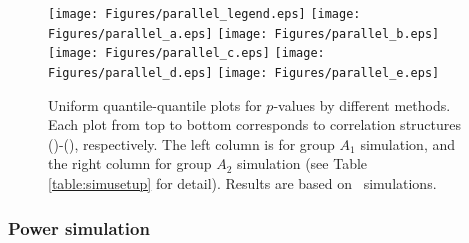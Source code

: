 	
	
	\begin{figure}[!ht]
		\begin{center}
			\texttt{[image: Figures/parallel\_legend.eps]}
			\texttt{[image: Figures/parallel\_a.eps]}
			\texttt{[image: Figures/parallel\_b.eps]}
			\texttt{[image: Figures/parallel\_c.eps]}
			\texttt{[image: Figures/parallel\_d.eps]}
			\texttt{[image: Figures/parallel\_e.eps]}
		\end{center} 
		\caption[Uniform quantile-quantile plots for $p$-values by different methods]{Uniform 
		quantile-quantile plots for $p$-values by different methods. Each plot 
		from top to bottom corresponds to correlation structures (\aaCase)-(\fCase), respectively. 
		The left column is for group $A_1$ simulation, and the right column for group $A_2$ 
		simulation (see Table \ref{table:simusetup} for detail). Results are based on
		\HowmanySimu~simulations.}\label{fig:typeIerror}
	\end{figure} 
	
	
	\subsubsection{Power simulation}\label{subsection:power}		 
	
	
